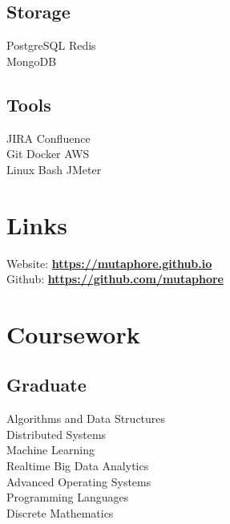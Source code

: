 \documentclass[letterpaper]{deedy-resume} %
\begin{document}
\begin{minipage}[t]{0.33\textwidth}
\subsection{Storage}
PostgreSQL \textbullet{}
Redis \\
MongoDB
\sectionspace
\subsection{Tools}
JIRA \textbullet{}
Confluence \\
Git \textbullet{}
Docker \textbullet{}
AWS \\
Linux \textbullet{}
Bash \textbullet{} 
JMeter \\

\sectionspace %


\section{Links} 

Website: \href{https://mutaphore.github.io}{\bf https://mutaphore.github.io} \\
Github: \href{https://github.com/mutaphore}{\bf https://github.com/mutaphore} \\

\sectionspace %


\section{Coursework}

\subsection{Graduate}

Algorithms and Data Structures \\
Distributed Systems \\
Machine Learning \\
Realtime Big Data Analytics \\
Advanced Operating Systems \\
Programming Languages \\
Discrete Mathematics


\end{minipage}
\end{document}
